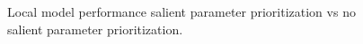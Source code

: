 \begin{figure}[h]
    \vspace{-10px}

  \centering


  \caption{Local model performance salient parameter prioritization vs no salient parameter prioritization.}
  \label{fig:ablaton}
\end{figure}